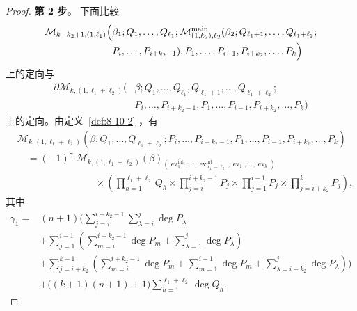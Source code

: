 \begin{proof}
\par\smallskip\noindent\textbf{第 2 步。}
下面比较
\[
\begin{aligned}
\mathcal M_{k-k_2+1,(1,\ell_1)}\Bigl(&
\beta_1;Q_1,\ldots,Q_{\ell_1};
\mathcal M_{(1,k_2),\ell_2}^{\mathrm{main}}
(\beta_2;Q_{\ell_1+1},\ldots,Q_{\ell_1+\ell_2};\\[-2pt]
&P_i,\ldots,P_{i+k_2-1}),
P_1,\ldots,P_{i-1},P_{i+k_2},\ldots,P_k\Bigr)
\end{aligned}
\]
上的定向与
\[
\begin{aligned}
\partial\mathcal M_{k,(1,\ell_1+\ell_2)}
\bigl(&\beta;Q_1,\ldots,Q_{\ell_1},Q_{\ell_1+1},\ldots,Q_{\ell_1+\ell_2};\\[-2pt]
&P_i,\ldots,P_{i+k_2-1},P_1,\ldots,P_{i-1},
P_{i+k_2},\ldots,P_k\bigr)
\end{aligned}
\]
上的定向。由定义~\ref{def:8-10-2}
，有
\begingroup
\small
\[
\begin{aligned}
&\mathcal M_{k,(1,\ell_1+\ell_2)}
(\beta;Q_1,\ldots,Q_{\ell_1+\ell_2};
P_i,\ldots,P_{i+k_2-1},P_1,\ldots,P_{i-1},P_{i+k_2},\ldots,P_k)\\
&\quad={}
(-1)^{\gamma_1}
\mathcal M_{k,(1,\ell_1+\ell_2)}(\beta)_
{(\operatorname{ev}_1^{\mathrm{int}},\ldots,
\operatorname{ev}_{\ell_1+\ell_2}^{\mathrm{int}},
\operatorname{ev}_1,\ldots,\operatorname{ev}_k)}\\[-2pt]
&\hspace{8em}{}\times
\left(\prod_{h=1}^{\ell_1+\ell_2}Q_h
\times\prod_{j=i}^{i+k_2-1}P_j
\times\prod_{j=1}^{i-1}P_j
\times\prod_{j=i+k_2}^{k}P_j\right),
\end{aligned}
\]
\endgroup
其中
\[
\begin{aligned}
\gamma_1={}&(n+1)\Bigg(
\sum_{j=i}^{i+k_2-1}\sum_{\lambda=i}^{j}\deg P_\lambda\\
&+\sum_{j=1}^{i-1}\left(
\sum_{m=i}^{i+k_2-1}\deg P_m
+\sum_{\lambda=1}^{j}\deg P_\lambda\right)\\
&+\sum_{j=i+k_2}^{k-1}\left(
\sum_{m=i}^{i+k_2-1}\deg P_m
+\sum_{m=1}^{i-1}\deg P_m
+\sum_{\lambda=i+k_2}^{j}\deg P_\lambda\right)\Bigg)\\
&+\bigl((k+1)(n+1)+1\bigr)
\sum_{h=1}^{\ell_1+\ell_2}\deg Q_h.
\end{aligned}
\]


\end{proof}
